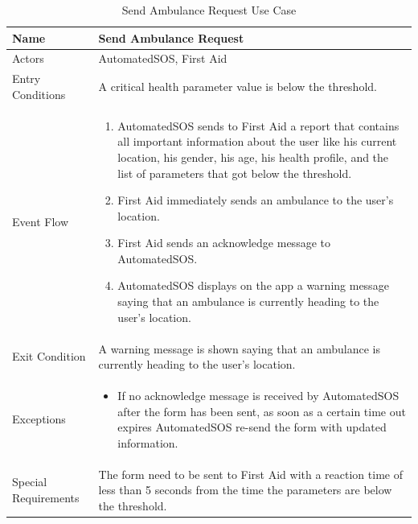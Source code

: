 \begin{enumerate}
\FloatBarrier
\begin{table}[h]
\begin{tabular}{|p{3.4cm}|p{}|}
\hline
Name             & Send Ambulance Request \\ \hline
Actors           & AutomatedSOS, First Aid  \\ \hline
Entry Conditions & A critical health parameter value is below the threshold.
\\ \hline
Event Flow       & \begin{enumerate}
            \item AutomatedSOS sends to First Aid a report that contains all important information about the user like his current location, his gender, his age, his health profile, and the list of parameters that got below the threshold.
            \item First Aid immediately sends an ambulance to the user's location.
			\item First Aid sends an acknowledge message to AutomatedSOS.            
            \item AutomatedSOS displays on the app a warning message saying that an ambulance is currently heading to the user's location. 
        \end{enumerate}
\\ \hline
Exit Condition   & A warning message is shown saying that an ambulance is currently heading to the user's location.
\\ \hline
Exceptions       & \begin{itemize}
\item If no acknowledge message is received by AutomatedSOS after the form has been sent, as soon as a certain time out expires AutomatedSOS re-send the form with updated information. 
\end{itemize}
\\ \hline
Special Requirements & The form need to be sent to First Aid with a reaction time of less than 5 seconds from the time the parameters are below the threshold.
\\ \hline 
\end{tabular}
\caption{Send Ambulance Request Use Case}
\end{table}
\FloatBarrier


\end{enumerate}

